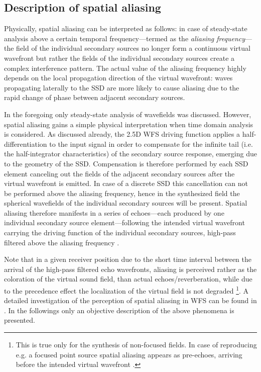 \subsection{Description of spatial aliasing}

Physically, spatial aliasing can be interpreted as follows: in case of steady-state analysis above a certain temporal frequency---termed as the \emph{aliasing frequency}--- the field of the individual secondary sources no longer form a continuous virtual wavefront but rather the fields of the individual secondary sources create a complex interference pattern.
The actual value of the aliasing frequency highly depends on the local propagation direction of the virtual wavefront: waves propagating laterally to the SSD are more likely to cause aliasing due to the rapid change of phase between adjacent secondary sources.

In the foregoing only steady-state analysis of wavefields was discussed.
However, spatial aliasing gains a simple physical interpretation when time domain analysis is considered.
As discussed already, the 2.5D WFS driving function applies a half-differentiation to the input signal in order to compensate for the infinite tail (i.e. the half-integrator characteristics) of the secondary source response, emerging due to the geometry of the SSD.
Compensation is therefore performed by each SSD element canceling out the fields of the adjacent secondary sources after the virtual wavefront is emitted.
In case of a discrete SSD this cancellation can not be performed above the aliasing frequency, hence in the synthesized field the spherical wavefields of the individual secondary sources will be present.
Spatial aliasing therefore manifests in a series of echoes---each produced by one individual secondary source element---following the intended virtual wavefront carrying the driving function of the individual secondary sources, high-pass filtered above the aliasing frequency \cite{spors2009spatial}. 

Note that in a given receiver position due to the short time interval between the arrival of the high-pass filtered echo wavefronts, aliasing is perceived rather as the coloration of the virtual sound field, than actual echoes/reverberation, while due to the precedence effect the localization of the virtual field is not degraded \footnote{This is true only for the synthesis of non-focused fields.
In case of reproducing e.g. a focused point source spatial aliasing appears as pre-echoes, arriving before the intended virtual wavefront \cite{Spors2009:FocusedSourceAliasing}.}.
A detailed investigation of the perception of spatial aliasing in WFS can be found in \cite{8371275}.
In the followings only an objective description of the above phenomena is presented.

